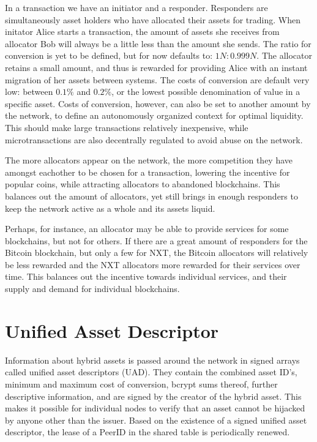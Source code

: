 \documentclass[a4paper]{article}
\begin{document}
In a transaction we have an initiator and a responder. Responders are simultaneously asset holders who have allocated their assets for trading. When initator Alice starts a transaction, the amount of assets she receives from allocator Bob will always be a little less than the amount she sends. The ratio for conversion is yet to be defined, but for now defaults to: $1N : 0.999N$.  The allocator retains a small amount, and thus is rewarded for providing Alice with an instant migration of her assets between systems. The costs of conversion are default very low: between $0.1\%$ and $0.2\%$, or the lowest possible denomination of value in a specific asset. Costs of conversion, however, can also be set to another amount by the network, to define an autonomously organized context for optimal liquidity. This should make large transactions relatively inexpensive, while microtransactions are also decentrally regulated to avoid abuse on the network.

The more allocators appear on the network, the more competition they have amongst eachother to be chosen for a transaction, lowering the incentive for popular coins, while attracting allocators to abandoned blockchains. This balances out the amount of allocators, yet still brings in enough responders to keep the network active as a whole and its assets liquid.

Perhaps, for instance, an allocator may be able to provide services for some blockchains, but not for others. If there are a great amount of responders for the Bitcoin blockchain, but only a few for NXT, the Bitcoin allocators will relatively be less rewarded and the NXT allocators more rewarded for their services over time. This balances out the incentive towards individual services, and their supply and demand for individual blockchains.


\section{Unified Asset Descriptor}

Information about hybrid assets is passed around the network in signed arrays called unified asset descriptors (UAD). They contain the combined asset ID's, minimum and maximum cost of conversion, bcrypt sums thereof, further descriptive information, and are signed by the creator of the hybrid asset. This makes it possible for individual nodes to verify that an asset cannot be hijacked by anyone other than the issuer. Based on the existence of a signed unified asset descriptor, the lease of a PeerID in the shared table is periodically renewed.
\end{document}
